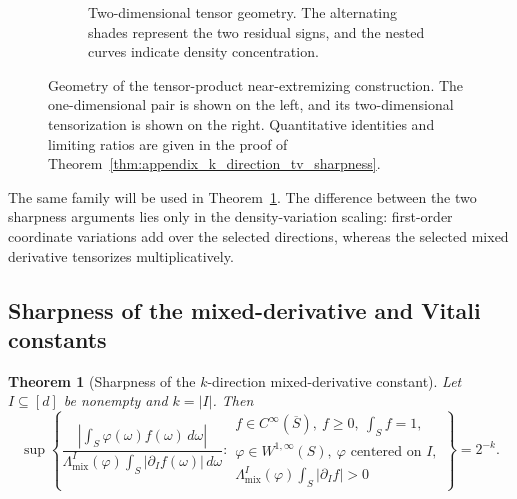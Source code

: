 \documentclass[11pt,letterpaper]{article}
\newtheorem{theorem}{Theorem}[section]
\theoremstyle{definition}
\theoremstyle{remark}
\begin{document}
\begin{figure}[t]
\begin{subfigure}[t]{0.49\textwidth}
\caption{Two-dimensional tensor geometry. The alternating shades represent
the two residual signs, and the nested curves indicate density concentration.}
\label{fig:appendix_unified_sharpness_2d}
\end{subfigure}

\caption{
Geometry of the tensor-product near-extremizing construction. The
one-dimensional pair is shown on the left, and its two-dimensional
tensorization is shown on the right. Quantitative identities and limiting
ratios are given in the proof of
Theorem~\ref{thm:appendix_k_direction_tv_sharpness}.
}
\label{fig:appendix_unified_sharpness_construction}
\end{figure}

The same family will be used in
Theorem~\ref{thm:appendix_k_direction_mixed_sharpness}. The difference between
the two sharpness arguments lies only in the density-variation scaling:
first-order coordinate variations add over the selected directions, whereas
the selected mixed derivative tensorizes multiplicatively.




\subsection{Sharpness of the mixed-derivative and Vitali constants}
\label{subsec:appendix_mixed_vitali_sharpness}
  

\begin{theorem}[Sharpness of the $k$-direction mixed-derivative constant]
\label{thm:appendix_k_direction_mixed_sharpness}
Let $I\subseteq[d]$ be nonempty and $k=|I|$. Then
\begin{equation}
\label{eq:appendix_mixed_sharpness_supremum}
\sup
\left\{
\frac{
\left|\int_S\varphi(\omega)f(\omega)\,d\omega\right|
}
{
\Lambda_{\mathrm{mix}}^I(\varphi)
\int_S|\partial_I f(\omega)|\,d\omega
}:
\begin{array}{l}
f\in C^\infty(\overline S),\ f\ge0,\ \int_Sf=1,\\
\varphi\in W^{1,\infty}(S),\ \varphi\text{ centered on }I,\\
\Lambda_{\mathrm{mix}}^I(\varphi)\int_S|\partial_I f|>0
\end{array}
\right\}
=
2^{-k}.
\end{equation}
\end{theorem}
\end{document}
